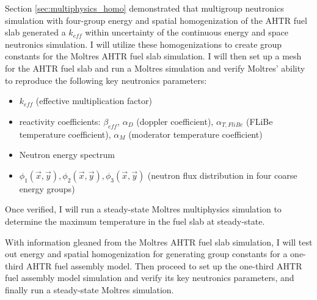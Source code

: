 Section \ref{sec:multiphysics_homo} demonstrated that multigroup neutronics 
simulation with four-group energy and spatial homogenization of the \gls{AHTR} 
fuel slab generated a $k_{eff}$ within uncertainty of the continuous energy and 
space neutronics simulation. I will utilize these homogenizations to create 
group constants for the Moltres \gls{AHTR} fuel slab simulation. I will then 
set up a mesh for the \gls{AHTR} fuel slab and run a Moltres simulation and 
verify Moltres' ability to reproduce the following key neutronics parameters: 
\begin{itemize}
  \item $k_{eff}$ (effective multiplication factor)
  \item reactivity coefficients: $\beta_{eff}$, $\alpha_D$ (doppler coefficient), 
  $\alpha_{T, FliBe}$ (\gls{FLiBe} temperature coefficient), $\alpha_{M}$ 
  (moderator temperature coefficient)
  \item Neutron energy spectrum 
  \item $\phi_1(\vec{x},\vec{y}), \phi_2(\vec{x},\vec{y}), \phi_3(\vec{x},\vec{y})$ 
  (neutron flux distribution in four coarse energy groups) 
\end{itemize}
Once verified, I will run a steady-state Moltres multiphysics simulation to 
determine the maximum temperature in the fuel slab at steady-state. 

With information gleaned from the Moltres \gls{AHTR} fuel slab simulation, I 
will test out energy and spatial homogenization for generating group constants 
for a one-third \gls{AHTR} fuel assembly model.  
Then proceed to set up the one-third \gls{AHTR} fuel assembly model simulation
and verify its key neutronics parameters, and finally run a steady-state 
Moltres simulation. 

